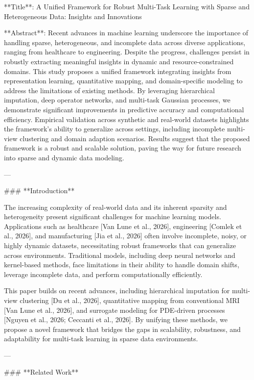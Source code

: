 **Title**: A Unified Framework for Robust Multi-Task Learning with Sparse and Heterogeneous Data: Insights and Innovations  

**Abstract**:  
Recent advances in machine learning underscore the importance of handling sparse, heterogeneous, and incomplete data across diverse applications, ranging from healthcare to engineering. Despite the progress, challenges persist in robustly extracting meaningful insights in dynamic and resource-constrained domains. This study proposes a unified framework integrating insights from representation learning, quantitative mapping, and domain-specific modeling to address the limitations of existing methods. By leveraging hierarchical imputation, deep operator networks, and multi-task Gaussian processes, we demonstrate significant improvements in predictive accuracy and computational efficiency. Empirical validation across synthetic and real-world datasets highlights the framework's ability to generalize across settings, including incomplete multi-view clustering and domain adaption scenarios. Results suggest that the proposed framework is a robust and scalable solution, paving the way for future research into sparse and dynamic data modeling.  

---

### **Introduction**  

The increasing complexity of real-world data and its inherent sparsity and heterogeneity present significant challenges for machine learning models. Applications such as healthcare [Van Lune et al., 2026], engineering [Comlek et al., 2026], and manufacturing [Jia et al., 2026] often involve incomplete, noisy, or highly dynamic datasets, necessitating robust frameworks that can generalize across environments. Traditional models, including deep neural networks and kernel-based methods, face limitations in their ability to handle domain shifts, leverage incomplete data, and perform computationally efficiently.  

This paper builds on recent advances, including hierarchical imputation for multi-view clustering [Du et al., 2026], quantitative mapping from conventional MRI [Van Lune et al., 2026], and surrogate modeling for PDE-driven processes [Nguyen et al., 2026; Ceccanti et al., 2026]. By unifying these methods, we propose a novel framework that bridges the gaps in scalability, robustness, and adaptability for multi-task learning in sparse data environments.  

---

### **Related Work**  

